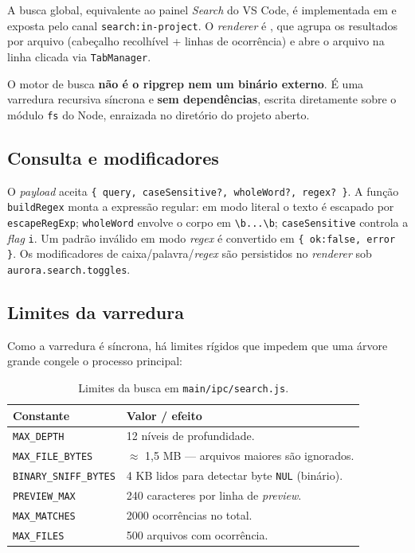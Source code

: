 A busca global, equivalente ao painel \textit{Search} do VS Code, é
implementada em  e exposta pelo canal
\lstinline|search:in-project|. O \textit{renderer} é ,
que agrupa os resultados por arquivo (cabeçalho recolhível + linhas de
ocorrência) e abre o arquivo na linha clicada via \lstinline|TabManager|.

\begin{nota}
O motor de busca \textbf{não é o ripgrep nem um binário externo}. É uma
varredura recursiva síncrona e \textbf{sem dependências}, escrita diretamente
sobre o módulo \lstinline|fs| do Node, enraizada no diretório do projeto aberto.
\end{nota}

\subsection{Consulta e modificadores}

O \textit{payload} aceita \lstinline|{ query, caseSensitive?, wholeWord?, regex? }|.
A função \lstinline|buildRegex| monta a expressão regular: em modo literal o
texto é escapado por \lstinline|escapeRegExp|; \lstinline|wholeWord| envolve o
corpo em \lstinline|\b...\b|; \lstinline|caseSensitive| controla a \textit{flag}
\lstinline|i|. Um padrão inválido em modo \textit{regex} é convertido em
\lstinline|{ ok:false, error }|. Os modificadores de caixa/palavra/\textit{regex}
são persistidos no \textit{renderer} sob \lstinline|aurora.search.toggles|.

\subsection{Limites da varredura}

Como a varredura é síncrona, há limites rígidos que impedem que uma árvore
grande congele o processo principal:

\begin{table}[h]
\centering
\caption{Limites da busca em \texttt{main/ipc/search.js}.}
\label{tab:13-busca-limites}
\small
\begin{tabularx}{\linewidth}{Y Y}
\toprule
\textbf{Constante} & \textbf{Valor / efeito} \\
\midrule
\lstinline|MAX_DEPTH|         & 12 níveis de profundidade. \\
\lstinline|MAX_FILE_BYTES|    & $\approx$ 1,5 MB — arquivos maiores são ignorados. \\
\lstinline|BINARY_SNIFF_BYTES|& 4 KB lidos para detectar byte \texttt{NUL} (binário). \\
\lstinline|PREVIEW_MAX|       & 240 caracteres por linha de \textit{preview}. \\
\lstinline|MAX_MATCHES|       & 2000 ocorrências no total. \\
\lstinline|MAX_FILES|         & 500 arquivos com ocorrência. \\
\bottomrule
\end{tabularx}
\end{table}

